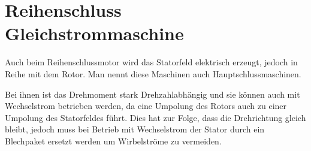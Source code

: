 \section{Reihenschluss Gleichstrommaschine}
\label{reihen}

Auch beim Reihenschlussmotor wird das Statorfeld elektrisch erzeugt, jedoch in Reihe mit dem Rotor.
Man nennt diese Maschinen auch Hauptschlussmaschinen.

Bei ihnen ist das Drehmoment stark Drehzahlabhängig und sie können auch mit Wechselstrom betrieben werden, da eine Umpolung des Rotors auch zu einer Umpolung des Statorfeldes führt.
Dies hat zur Folge, dass die Drehrichtung gleich bleibt, jedoch muss bei Betrieb mit Wechselstrom der Stator durch ein Blechpaket ersetzt werden um Wirbelströme zu vermeiden.

\cite{dcdewiki:208635995}